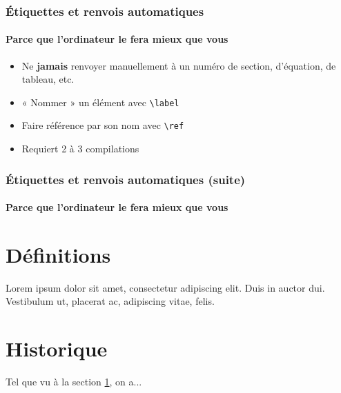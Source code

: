 
\begin{frame}[c,fragile]
	
	\frametitle{Étiquettes et renvois automatiques}
	\framesubtitle{Parce que l'ordinateur le fera mieux que vous}
	
	\begin{itemize}
		\item Ne \textbf{jamais} renvoyer manuellement à un numéro de section,
		d’équation, de tableau, etc.
		\item « Nommer » un élément avec \lstinline|\label|
		\item Faire référence par son nom avec \lstinline|\ref|
		\item Requiert 2 à 3 compilations
	\end{itemize}
\end{frame}


\begin{frame}[c,fragile]

	\frametitle{Étiquettes et renvois automatiques (suite)}
	\framesubtitle{Parce que l'ordinateur le fera mieux que vous}
	
	\begin{codesource}
	\section{Définitions}
	\label{sec:definitions}
	Lorem ipsum dolor sit amet, consectetur
	adipiscing elit. Duis in auctor dui. Vestibulum
	ut, placerat ac, adipiscing vitae, felis.
	\section{Historique}
	Tel que vu à la section \ref{sec:definitions},
	on a...
	\end{codesource}
\end{frame}



